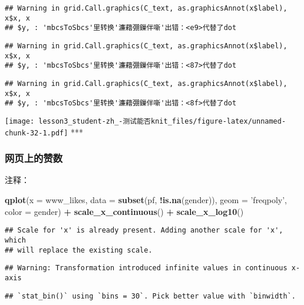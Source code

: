 \documentclass[]{article}
\newenvironment{Shaded}{\begin{snugshade}}{\end{snugshade}}
\newcommand{\DataTypeTok}[1]{\textcolor[rgb]{0.13,0.29,0.53}{#1}}
\newcommand{\KeywordTok}[1]{\textcolor[rgb]{0.13,0.29,0.53}{\textbf{#1}}}
\newcommand{\NormalTok}[1]{#1}
\newcommand{\OperatorTok}[1]{\textcolor[rgb]{0.81,0.36,0.00}{\textbf{#1}}}
\newcommand{\StringTok}[1]{\textcolor[rgb]{0.31,0.60,0.02}{#1}}
\begin{document}
\begin{verbatim}
## Warning in grid.Call.graphics(C_text, as.graphicsAnnot(x$label), x$x, x
## $y, : 'mbcsToSbcs'里转换'濂藉弸鏁伴噺'出错：<e9>代替了dot
\end{verbatim}

\begin{verbatim}
## Warning in grid.Call.graphics(C_text, as.graphicsAnnot(x$label), x$x, x
## $y, : 'mbcsToSbcs'里转换'濂藉弸鏁伴噺'出错：<87>代替了dot
\end{verbatim}

\begin{verbatim}
## Warning in grid.Call.graphics(C_text, as.graphicsAnnot(x$label), x$x, x
## $y, : 'mbcsToSbcs'里转换'濂藉弸鏁伴噺'出错：<8f>代替了dot
\end{verbatim}

\texttt{[image: lesson3\_student-zh\_-测试能否knit\_files/figure-latex/unnamed-chunk-32-1.pdf]}
***

\subsubsection{网页上的赞数}

注释：

\begin{Shaded}
\begin{Highlighting}[]
\KeywordTok{qplot}\NormalTok{(}\DataTypeTok{x =}\NormalTok{ www_likes, }\DataTypeTok{data =} \KeywordTok{subset}\NormalTok{(pf, }\OperatorTok{!}\KeywordTok{is.na}\NormalTok{(gender)),}
      \DataTypeTok{geom =} \StringTok{'freqpoly'}\NormalTok{, }\DataTypeTok{color =}\NormalTok{ gender) }\OperatorTok{+}
\StringTok{  }\KeywordTok{scale_x_continuous}\NormalTok{() }\OperatorTok{+}\StringTok{ }
\StringTok{  }\KeywordTok{scale_x_log10}\NormalTok{()}
\end{Highlighting}
\end{Shaded}

\begin{verbatim}
## Scale for 'x' is already present. Adding another scale for 'x', which
## will replace the existing scale.
\end{verbatim}

\begin{verbatim}
## Warning: Transformation introduced infinite values in continuous x-axis
\end{verbatim}

\begin{verbatim}
## `stat_bin()` using `bins = 30`. Pick better value with `binwidth`.
\end{verbatim}
\end{document}
